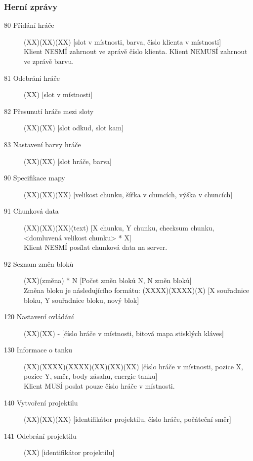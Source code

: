 \documentclass[12pt,a4paper]{article}
\begin{document}
\subsubsection*{Herní zprávy}
\begin{description}
\item[80 Přidání hráče] (XX)(XX)(XX) [slot v místnosti, barva, číslo klienta v místnosti] \\
Klient NESMÍ zahrnout ve zprávě číslo klienta. Klient NEMUSÍ zahrnout ve zprávě barvu.
\item[81 Odebrání hráče] (XX) [slot v místnosti]
\item[82 Přesunutí hráče mezi sloty] (XX)(XX) [slot odkud, slot kam]
\item[83 Nastavení barvy hráče] (XX)(XX) [slot hráče, barva]

\item[90 Specifikace mapy] (XX)(XX)(XX) [velikost chunku, šířka v chuncích, výška v chuncích]
\item[91 Chunková data] (XX)(XX)(XX)(text) [X chunku, Y chunku, checksum chunku, <domluvená velikost chunku> * X]\\
Klient NESMÍ posílat chunková data na server.
\item[92 Seznam změn bloků] (XX)(změna) * N [Počet změn bloků N, N změn bloků]\\ 
Změna bloku je následujícího formátu: (XXXX)(XXXX)(X) [X souřadnice bloku, Y souřadnice bloku, nový blok]

\item[120 Nastavení ovládání] (XX)(XX) - [číslo hráče v místnosti, bitová mapa stisklých kláves]
\item[130 Informace o tanku] (XX)(XXXX)(XXXX)(XX)(XX)(XX) [číslo hráče v místnosti, pozice X, pozice Y, směr, body zásahu, energie tanku] \\
Klient MUSÍ poslat pouze číslo hráče v místnosti.
\item[140 Vytvoření projektilu] (XX)(XX)(XX) [identifikátor projektilu, číslo hráče, počáteční směr]
\item[141 Odebrání projektilu] (XX) [identifikátor projektilu]
\end{description}




\end{document}
